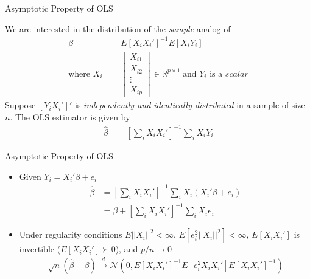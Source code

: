 \documentclass[aspectratio=1610,12pt,xcolor=dvipsnames]{beamer}
\begin{document}
\begin{frame}{Asymptotic Property of OLS}

We are interested in the distribution of the \textit{sample} analog of 
\begin{align*}
    \beta &= E[X_iX_i']^{-1}E[X_iY_i] \\
    \text{where } X_i &=
    \begin{bmatrix}
    X_{i1} \\
    X_{i2} \\
    \vdots \\
    X_{ip}
    \end{bmatrix}
    \in \mathbb{R}^{p\times 1} \hspace{3pt} 
    \text{and } Y_i \text{ is a } \textit{scalar}
\end{align*}
Suppose $[Y_i X_i']'$ is \textit{independently and identically distributed} in a sample of size $n$. The OLS estimator is given by
\begin{align*}
    \hat{\beta} &= \left[\sum_i X_i X_i' \right]^{-1} \sum_i X_i Y_i
\end{align*}
\end{frame}

\begin{frame}{Asymptotic Property of OLS}
    \begin{itemize}
        \item Given $Y_i = X_i'\beta + e_i$
        \begin{align*}
        \hat{\beta} &= \left[\sum_i X_i X_i' \right]^{-1} \sum_i X_i \left( X_i'\beta + e_i \right) \\
        &= \beta + \left[\sum_i X_i X_i' \right]^{-1} \sum_i X_ie_i
        \end{align*}
        \item Under regularity conditions $E||X_i||^2 < \infty$, $E\left[e_i^2||X_i||^2\right] < \infty$, $E[X_iX_i']$ is  invertible ($E[X_iX_i'] \succ 0$), and $p/n \rightarrow 0$
        \begin{align*}
            \sqrt{n}(\hat{\beta}-\beta) \xrightarrow{d} \mathcal{N}\left( 0, E[X_iX_i']^{-1}E[e_i^2 X_i X_i'] E[X_iX_i']^{-1} \right)
        \end{align*}
    \end{itemize}
\end{frame}
\end{document}
